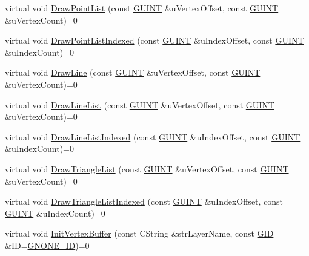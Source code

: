 \begin{DoxyCompactItemize}
virtual void \hyperlink{class_c_g_d_c_a6edfea12588b4ad8851302ca57a01739}{Draw\+Point\+List} (const \hyperlink{_g_types_8h_a415305cdf38fc38f67c037973e9a748c}{G\+U\+I\+N\+T} \&u\+Vertex\+Offset, const \hyperlink{_g_types_8h_a415305cdf38fc38f67c037973e9a748c}{G\+U\+I\+N\+T} \&u\+Vertex\+Count)=0
\item 
virtual void \hyperlink{class_c_g_d_c_a60b2419455124ab6ff96e3252afc6823}{Draw\+Point\+List\+Indexed} (const \hyperlink{_g_types_8h_a415305cdf38fc38f67c037973e9a748c}{G\+U\+I\+N\+T} \&u\+Index\+Offset, const \hyperlink{_g_types_8h_a415305cdf38fc38f67c037973e9a748c}{G\+U\+I\+N\+T} \&u\+Index\+Count)=0
\item 
virtual void \hyperlink{class_c_g_d_c_a651eac824a3f4ee8438fb31252cca0de}{Draw\+Line} (const \hyperlink{_g_types_8h_a415305cdf38fc38f67c037973e9a748c}{G\+U\+I\+N\+T} \&u\+Vertex\+Offset, const \hyperlink{_g_types_8h_a415305cdf38fc38f67c037973e9a748c}{G\+U\+I\+N\+T} \&u\+Vertex\+Count)=0
\item 
virtual void \hyperlink{class_c_g_d_c_a44c44df4a7546365dc2c23677dbbc1b4}{Draw\+Line\+List} (const \hyperlink{_g_types_8h_a415305cdf38fc38f67c037973e9a748c}{G\+U\+I\+N\+T} \&u\+Vertex\+Offset, const \hyperlink{_g_types_8h_a415305cdf38fc38f67c037973e9a748c}{G\+U\+I\+N\+T} \&u\+Vertex\+Count)=0
\item 
virtual void \hyperlink{class_c_g_d_c_afe1349c1c80c906fc7aeb295d3610df7}{Draw\+Line\+List\+Indexed} (const \hyperlink{_g_types_8h_a415305cdf38fc38f67c037973e9a748c}{G\+U\+I\+N\+T} \&u\+Index\+Offset, const \hyperlink{_g_types_8h_a415305cdf38fc38f67c037973e9a748c}{G\+U\+I\+N\+T} \&u\+Index\+Count)=0
\item 
virtual void \hyperlink{class_c_g_d_c_a1e2cfd1707f75975a3f1af48ae7c7eb1}{Draw\+Triangle\+List} (const \hyperlink{_g_types_8h_a415305cdf38fc38f67c037973e9a748c}{G\+U\+I\+N\+T} \&u\+Vertex\+Offset, const \hyperlink{_g_types_8h_a415305cdf38fc38f67c037973e9a748c}{G\+U\+I\+N\+T} \&u\+Vertex\+Count)=0
\item 
virtual void \hyperlink{class_c_g_d_c_a1e33916145c67f37a7f014b820347474}{Draw\+Triangle\+List\+Indexed} (const \hyperlink{_g_types_8h_a415305cdf38fc38f67c037973e9a748c}{G\+U\+I\+N\+T} \&u\+Index\+Offset, const \hyperlink{_g_types_8h_a415305cdf38fc38f67c037973e9a748c}{G\+U\+I\+N\+T} \&u\+Index\+Count)=0
\item 
virtual void \hyperlink{class_c_g_d_c_a762cf2e8e37e867b25dc1b7d9d21155f}{Init\+Vertex\+Buffer} (const C\+String \&str\+Layer\+Name, const \hyperlink{_g_types_8h_a5b96ecb16d8e437977d12cd40aa6f6d8}{G\+I\+D} \&I\+D=\hyperlink{_g_types_8h_a3d3e95c8557b67abe2ddd1726a2e4d9a}{G\+N\+O\+N\+E\+\_\+\+I\+D})=0

\end{DoxyCompactItemize}
